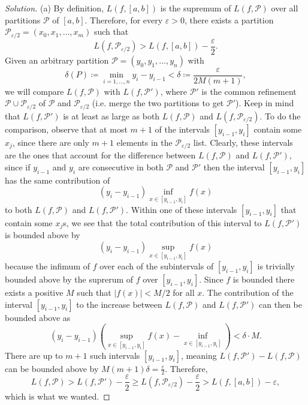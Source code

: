 \documentclass[11pt]{article}
\providecommand{\eps}{\varepsilon}
\newenvironment{soln}{\begin{proof}[Solution]}{\end{proof}}
\providecommand{\abs}[1]{\left|#1\right|}
\begin{document}
\begin{soln}
    (a) By definition, $L(f,[a,b])$ is the supremum of
    $L(f,\mathcal P)$ over all partitions $\mathcal P$ of $[a,b]$.
    Therefore, for every $\eps > 0$, there exists
    a partition $\mathcal P_{\eps/2} = (x_0, x_1, \dots, x_m)$ such that
    \begin{equation*}
	L(f,\mathcal P_{\eps/2}) > L(f, [a,b]) - \frac\eps2.
    \end{equation*}
    Given an arbitrary partition $\mathcal P = (y_0, y_1, \dots, y_n)$ with
    \begin{equation*}
	\delta(P) \coloneq \min_{i=1,\dots,n} y_i - y_{i-1} <
	\delta \coloneq \frac{\eps}{2M(m+1)},
    \end{equation*}
    we will compare $L(f,\mathcal P)$ with $L(f,\mathcal P')$,
    where $\mathcal P'$ is the common refinement
    $\mathcal P\cup\mathcal P_{\eps/2}$ of $\mathcal P$ and $\mathcal P_{\eps/2}$
    (i.e. merge the two partitions to get $\mathcal P'$).
    Keep in mind that $L(f,\mathcal P')$ is at least as large as
    both $L(f,\mathcal P)$ and $L(f,\mathcal P_{\eps/2})$.
    To do the comparison, observe that at most $m+1$ of the intervals
    $[y_{i-1}, y_i]$ contain some $x_j$, since there are only $m+1$ elements
    in the $\mathcal P_{\eps/2}$ list.
    Clearly, these intervals are the ones that account for
    the difference between $L(f,\mathcal P)$ and $L(f,\mathcal P')$,
    since if $y_{i-1}$ and $y_i$ are consecutive in both $\mathcal P$ and $\mathcal P'$
    then the interval $[y_{i-1},y_i]$ has the same contribution of
    \begin{equation*}
	(y_i - y_{i-1})\inf_{x\in[y_{i-1},y_i]} f(x)
    \end{equation*}
    to both $L(f,\mathcal P)$ and $L(f,\mathcal P')$.
    Within one of these intervals $[y_{i-1}, y_i]$ that contain some $x_j$s,
    we see that the total contribution of this interval to $L(f,\mathcal P')$
    is bounded above by
    \begin{equation*}
	(y_i - y_{i-1})\sup_{x\in[y_{i-1}, y_i]} f(x)
    \end{equation*}
    because the infimum of $f$ over each of the subintervals of $[y_{i-1}, y_i]$
    is trivially bounded above by the suprerum of $f$ over $[y_{i-1}, y_i]$.
    Since $f$ is bounded there exists a positive $M$ such that
    $\abs{f(x)} < M/2$ for all $x$.
    The contribution of the interval $[y_{i-1}, y_i]$ to
    the increase between $L(f,\mathcal P)$ and $L(f,\mathcal P')$
    can then be bounded above as
    \begin{equation*}
	(y_i - y_{i-1})\left(\sup_{x\in[y_{i-1}, y_i]} f(x) -
	\inf_{x\in[y_{i-1}, y_i]}\right) <
	\delta\cdot M.
    \end{equation*}
    There are up to $m+1$ such intervals $[y_{i-1}, y_i]$,
    meaning $L(f, \mathcal P') - L(f, \mathcal P)$ can be bounded above by
    $M(m+1)\delta = \frac{\eps}2$. Therefore,
    \begin{equation*}
        L(f,\mathcal P) > L(f,\mathcal P') - \frac\eps2
	\ge L(f, \mathcal P_{\eps/2}) - \frac\eps2
	> L(f,[a,b]) - \eps,
    \end{equation*}
    which is what we wanted.


\end{soln}
\end{document}
